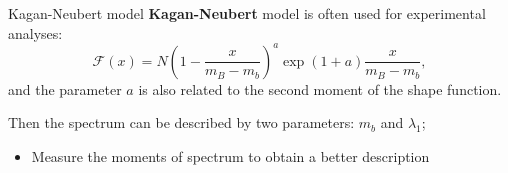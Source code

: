\documentclass[xcolor=dvipsnames]{beamer}
\begin{document}
   \begin{frame}{Kagan-Neubert model}
      \scriptsize
      \textbf{Kagan-Neubert} model is often used for experimental analyses:
      \begin{equation}\nonumber
         \mathcal{F}(x) = N\left(1-\frac{x}{m_B-m_b}\right)^a\exp{(1+a)\frac{x}{m_B-m_b}},
     \end{equation}
     and the parameter $a$ is also related to the second moment of the shape function.

     Then the spectrum can be described by two parameters: $m_b$ and $\lambda_1$;

     \begin{itemize}
      \item[\ra] Measure the moments of \BtoXsgamma spectrum to obtain a better description 
     \end{itemize}

   \end{frame}
\end{document}
